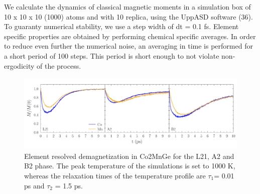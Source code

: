 We calculate the dynamics of classical magnetic moments in a simulation box of 10 x 10 x 10 (1000) atoms and with 10 replica, using the UppASD software (36). To guaranty numerical stability, we use a step width of dt = 0.1 fs. Element specific properties are obtained by performing chemical specific averages. In order to reduce even further the numerical noise, an averaging in time is performed for a short period of 100 steps. This period is short enough to not violate non-ergodicity of the process.

\begin{figure}[htbp]
	\begin{center}
		\includegraphics[width=150mm]{figs/LLGResults}
	\end{center}
	\caption{Element resolved demagnetization in Co2MnGe for the L21, A2 and B2 phase. The peak temperature of the simulations is set to 1000 K, whereas the relaxation times of the temperature profile are $\tau_1$= 0.01 ps and $\tau_2$ = 1.5 ps. }
	\label{fig: LLGResults}
\end{figure}

